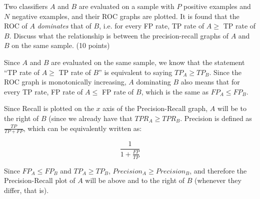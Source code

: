 \documentclass[fleqn]{homework}
\begin{document}
  \begin{problem}{3}
    \begin{question}
      Two classifiers $A$ and $B$ are evaluated on a sample with $P$ positive
      examples and $N$ negative examples, and their ROC graphs are plotted.  It
      is found that the ROC of $A$ \textit{dominates} that of $B$, i.e. for
      every FP rate, TP rate of $A \ge$ TP rate of $B$.  Discuss what the
      relationship is between the precision-recall graphs of $A$ and $B$ on the
      same sample. (10 points)
    \end{question}

    Since $A$ and $B$ are evaluated on the same sample, we know that the
    statement ``TP rate of $A \ge$ TP rate of $B$'' is equivalent to saying
    $TP_A \ge TP_B$.  Since the ROC graph is monotonically increasing, $A$
    dominating $B$ also means that for every TP rate, FP rate of $A \le$ FP rate
    of $B$, which is the same as $FP_A \le FP_B$.

    Since Recall is plotted on the $x$ axis of the Precision-Recall graph, $A$
    will be to the right of $B$ (since we already have that $TPR_A \ge TPR_B$.
    Precision is defined as $\frac{TP}{TP+FP}$, which can be equivalently
    written as:

    \begin{equation*}
      \frac{1}{1+\frac{FP}{TP}}
    \end{equation*}

    Since $FP_A \le FP_B$ and $TP_A \ge TP_B$, $Precision_A \ge Precision_B$,
    and therefore the Precision-Recall plot of $A$ will be above and to the
    right of $B$ (whenever they differ, that is).
  \end{problem}
\end{document}
